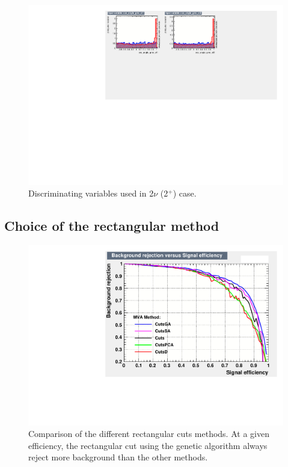 \documentclass[main.tex]{subfiles}
\begin{document}
\begin{figure} [h!]
\begin{center}
\includegraphics[scale=0.59]{pictures/FinalResults/bb2nu2/150/preselection/variablesBB2nu_2_c.pdf}
\end{center}
\caption{Discriminating variables used in 2$\nu$ (2$^+$) case.}
\label{Variables14TMVA2nu2}
\end{figure}

\FloatBarrier


\subsection{Choice of the rectangular method}\label{sec:ChoiceRCmethod}

\begin{figure} [h!]
\begin{center}
\includegraphics[scale=0.50]{pictures/Chap6/comparaison.pdf}
\end{center}
\caption{Comparison of the different rectangular cuts methods. At a given efficiency, the rectangular cut using the genetic algorithm always reject more background than the other methods.}
\label{comparisonRC}
\end{figure}
\end{document}
